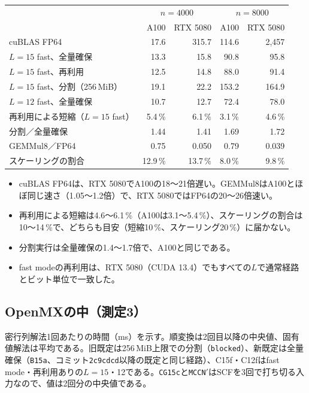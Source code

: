\documentclass[a4paper,11pt]{ltjsarticle}
\newcommand{\code}[1]{\texttt{#1}}
\begin{document}
\noindent\begin{tabularx}{\linewidth}{@{}Yrrrr@{}}
\toprule
 &  & \\
\cmidrule(lr){2-3}\cmidrule(l){4-5}
 & A100 & RTX 5080 & A100 & RTX 5080\\
\midrule
cuBLAS FP64 & 17.6 & 315.7 & 114.6 & 2,457\\
$L=15$ fast、全量確保 & 13.3 & 15.8 & 90.8 & 95.8\\
$L=15$ fast、再利用 & 12.5 & 14.8 & 88.0 & 91.4\\
$L=15$ fast、分割（256\,MiB） & 19.1 & 22.2 & 153.2 & 164.9\\
$L=12$ fast、全量確保 & 10.7 & 12.7 & 72.4 & 78.0\\
\midrule
再利用による短縮（$L=15$ fast） & 5.4\,\% & 6.1\,\% & 3.1\,\% & 4.6\,\%\\
分割／全量確保 & 1.44 & 1.41 & 1.69 & 1.72\\
GEMMul8／FP64 & 0.75 & 0.050 & 0.79 & 0.039\\
スケーリングの割合 & 12.9\,\% & 13.7\,\% & 8.0\,\% & 9.8\,\%\\
\bottomrule
\end{tabularx}

\medskip
\begin{itemize}
\item cuBLAS FP64は、RTX 5080でA100の18〜21倍遅い。GEMMul8はA100とほぼ同じ速さ（1.05〜1.2倍）で、RTX 5080ではFP64の20〜26倍速い。
\item 再利用による短縮は4.6〜6.1\,\%（A100は3.1〜5.4\,\%）、スケーリングの割合は10〜14\,\%で、どちらも目安（短縮10\,\%、スケーリング20\,\%）に届かない。
\item 分割実行は全量確保の1.4〜1.7倍で、A100と同じである。
\item fast modeの再利用は、RTX 5080（CUDA 13.4）でもすべての$L$で通常経路とビット単位で一致した。
\end{itemize}

\subsection{OpenMXの中（測定3）}
密行列解法1回あたりの時間（ms）を示す。順変換は2回目以降の中央値、固有値解法は平均である。旧既定は256\,MiB上限での分割（\code{blocked}）、新既定は全量確保（\code{B15a}、コミット\code{2c9cdcd}以降の既定と同じ経路）、C15f・C12fはfast mode・再利用ありの$L=15$・12である。\code{CG15c}と\code{MCCN}$'$はSCFを3回で打ち切る入力なので、値は2回分の中央値である。
\end{document}
